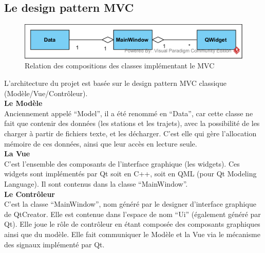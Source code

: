 \documentclass[12pt]{article}
\begin{document}
		\subsection{Le design pattern MVC}		
		\begin{figure}[!h]
		\begin{center}
		\includegraphics[scale=1]{dia_class_mvc.png}
		\caption{Relation des compositions des classes implémentant le MVC}
		\end{center}
		\end{figure}		
		
		L’architecture du projet est basée sur le design pattern MVC classique
		(Modèle/Vue/Contrôleur).\\
		
		\textbf{Le Modèle}\\
		Anciennement appelé “Model”, il a été renommé en “Data”, car cette classe ne fait
		que contenir des données (les stations et les trajets), avec la possibilité de les
		charger à partir de fichiers texte, et les décharger. C’est elle qui gère
		l’allocation mémoire de ces données, ainsi que leur accès en lecture seule.\\
		
		\textbf{La Vue}\\
		C’est l’ensemble des composants de l’interface graphique (les widgets). Ces widgets
		sont implémentés par Qt soit en C++, soit en QML (pour Qt Modeling Language). Il sont
		contenus dans la classe “MainWindow”.\\
				
		\textbf{Le Contrôleur}\\
		C’est la classe “MainWindow”, nom généré par le designer d’interface graphique de
		QtCreator. Elle est contenue dans l’espace de nom “Ui” (également généré par Qt).
		Elle joue le rôle de contrôleur en étant composée des composants graphiques ainsi que
		du modèle. Elle fait communiquer le Modèle et la Vue via le mécanisme des signaux
		implémenté par Qt.\\
			
\end{document}
